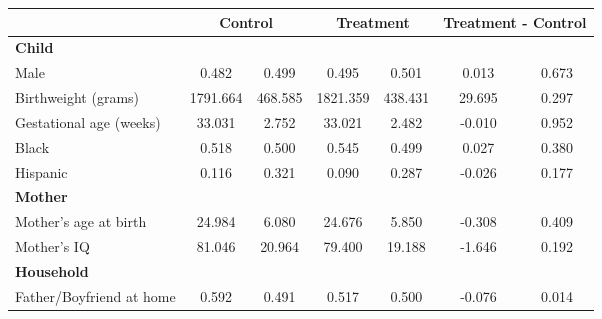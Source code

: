 \begin{tabular}{lcccccc}
\toprule
& \multicolumn{2}{c}{Control} & \multicolumn{2}{c}{Treatment} & \multicolumn{2}{c}{Treatment - Control} \\
\midrule
\textbf{Child} & & & & & & \\
\quad\quad Male & 0.482 & 0.499 & 0.495 & 0.501 & 0.013 & 0.673 \\
\quad\quad Birthweight (grams) & 1791.664 & 468.585 & 1821.359 & 438.431 & 29.695 & 0.297 \\
\quad\quad Gestational age (weeks) & 33.031 & 2.752 & 33.021 & 2.482 & -0.010 & 0.952 \\
\quad\quad Black & 0.518 & 0.500 & 0.545 & 0.499 & 0.027 & 0.380 \\
\quad\quad Hispanic & 0.116 & 0.321 & 0.090 & 0.287 & -0.026 & 0.177 \\
\textbf{Mother} & & & & & & \\
\quad\quad Mother's age at birth & 24.984 & 6.080 & 24.676 & 5.850 & -0.308 & 0.409 \\
\quad\quad Mother's IQ & 81.046 & 20.964 & 79.400 & 19.188 & -1.646 & 0.192 \\
\textbf{Household} & & & & & & \\
\quad\quad Father/Boyfriend at home & 0.592 & 0.491 & 0.517 & 0.500 & -0.076 & 0.014 \\
\bottomrule
\end{tabular}
